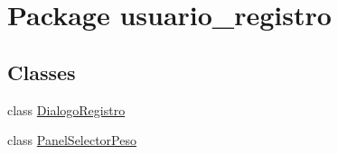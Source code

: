 \hypertarget{namespaceusuario__registro}{}\section{Package usuario\+\_\+registro}
\label{namespaceusuario__registro}
\subsection*{Classes}
\begin{DoxyCompactItemize}
\item 
class \mbox{\hyperlink{classusuario__registro_1_1_dialogo_registro}{Dialogo\+Registro}}
\item 
class \mbox{\hyperlink{classusuario__registro_1_1_panel_selector_peso}{Panel\+Selector\+Peso}}
\end{DoxyCompactItemize}
